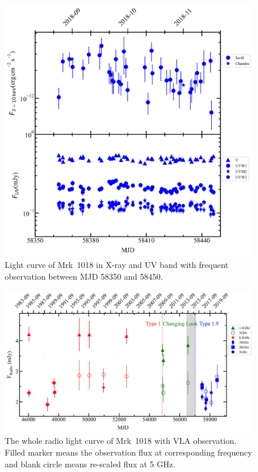 \documentclass[twocolumn]{aastex63}
\begin{document}
\begin{figure}
\centering
	\includegraphics[width=\textwidth]{./pic/subplots-xrt_uvot-radio-second-right-part.png}
    \caption{Light curve of Mrk~1018 in X-ray and UV band with frequent observation between MJD 58350 and 58450.}
    \label{fig:x-ray-lc-rp-secondaxis}
\end{figure}

\begin{figure}
\centering
	\includegraphics[width=\textwidth]{./pic/subplots-radio-second_freq.png}
    \caption{The whole radio light curve of Mrk~1018 with VLA observation. Filled marker means the observation flux at corresponding frequency and blank circle means re-scaled flux at 5 GHz.}
    \label{fig:radio-lc}
\end{figure}
\end{document}
